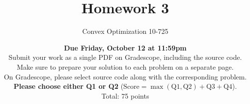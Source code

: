 \documentclass{article}
\theoremstyle{remark}
\theoremstyle{definition}
\begin{document}
\title{Homework 3}
\author{\Large Convex Optimization 10-725}
\date{{\bf Due Friday, October 12 at 11:59pm} \\
\bigskip
Submit your work as a single PDF on Gradescope, including the source code.\\
Make sure to prepare your solution to each problem on a separate page.  \\
On Gradescope, please select source code along with the corresponding problem. \\
\textbf{Please choose either Q1 or Q2} ($\text{Score}=\max(\text{Q1},\text{Q2})+\text{Q3}+\text{Q4}$).\\
\bigskip 
Total: 75 points}
\maketitle
\end{document}
